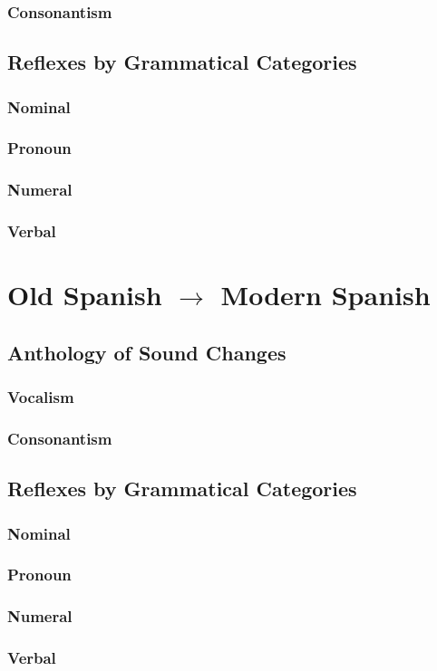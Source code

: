 \documentclass{report}
\begin{document}
\subsection{Consonantism}

\section{Reflexes by Grammatical Categories}

\subsection{Nominal}

\subsection{Pronoun}

\subsection{Numeral}

\subsection{Verbal}

\chapter{Old Spanish $\rightarrow$ Modern Spanish}

\section{Anthology of Sound Changes}

\subsection{Vocalism}

\subsection{Consonantism}

\section{Reflexes by Grammatical Categories}

\subsection{Nominal}

\subsection{Pronoun}

\subsection{Numeral}

\subsection{Verbal}
\end{document}
